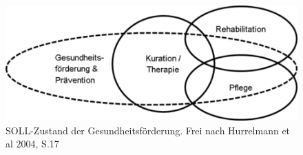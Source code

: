 \begin{figure}[h]
	\centering
		\includegraphics{ist-soll.png}
	\caption{SOLL-Zustand der Gesundheitsförderung. Frei nach Hurrelmann et al 2004, S.17}
	\label{fig:ist-soll}
\end{figure}